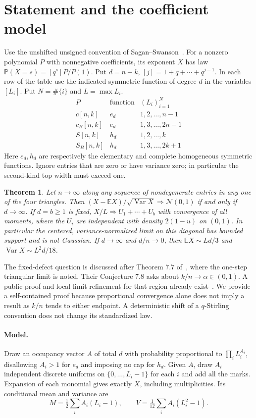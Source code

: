 \documentclass[11pt]{article}
\newtheorem{thm}{Theorem}\newtheorem{lem}{Lemma}\newcommand{\Var}{\operatorname{Var}}\newcommand{\Cov}{\operatorname{Cov}}\newcommand{\E}{\mathbb E}\newcommand{\Prob}{\mathbb P}
\begin{document}
\section{Statement and the coefficient model}
Use the unshifted unsigned convention of Sagan--Swanson~\cite{ss}. For a nonzero polynomial $P$ with nonnegative coefficients, its exponent $X$ has law $\Prob(X=s)=[q^s]P/P(1)$. Put $d=n-k$, $[j]=1+q+\cdots+q^{j-1}$. In each row of the table use the indicated symmetric function of degree $d$ in the variables $[L_i]$. Put $N=\#\{i\}$ and $L=\max L_i$.
\[
\begin{array}{c|cc}
P &\text{function}&(L_i)_{i=1}^N\\\hline
c[n,k]&e_d&1,2,\ldots,n-1\\
c_B[n,k]&e_d&1,3,\ldots,2n-1\\
S[n,k]&h_d&1,2,\ldots,k\\
S_B[n,k]&h_d&1,3,\ldots,2k+1
\end{array}
\]
Here $e_d,h_d$ are respectively the elementary and complete homogeneous symmetric functions. Ignore entries that are zero or have variance zero; in particular the second-kind top width must exceed one.
\begin{thm}\label{main}Let $n\to\infty$ along any sequence of nondegenerate entries in any one of the four triangles. Then $(X-\E X)/\sqrt{\Var X}\Rightarrow\mathcal N(0,1)$ if and only if $d\to\infty$. If $d=b\ge1$ is fixed, $X/L\Rightarrow U_1+\cdots+U_b$ with convergence of all moments, where the $U_i$ are independent with density $2(1-u)$ on $(0,1)$. In particular the centered, variance-normalized limit on this diagonal has bounded support and is not Gaussian. If $d\to\infty$ and $d/n\to0$, then $\E X\sim Ld/3$ and $\Var X\sim L^2d/18$.\end{thm}
The fixed-defect question is discussed after Theorem 7.7 of~\cite{ss}, where the one-step triangular limit is noted. Their Conjecture 7.8 asks about $k/n\to\alpha\in(0,1)$. A public proof and local limit refinement for that region already exist~\cite{prior}. We provide a self-contained proof because proportional convergence alone does not imply a result as $k/n$ tends to either endpoint. A deterministic shift of a $q$-Stirling convention does not change its standardized law.
\paragraph{Model.} Draw an occupancy vector $A$ of total $d$ with probability proportional to $\prod_i L_i^{A_i}$, disallowing $A_i>1$ for $e_d$ and imposing no cap for $h_d$. Given $A$, draw $A_i$ independent discrete uniforms on $\{0,\ldots,L_i-1\}$ for each $i$ and add all the marks. Expansion of each monomial gives exactly $X$, including multiplicities. Its conditional mean and variance are
\begin{equation}
M=\tfrac12\sum_i A_i(L_i-1),\qquad V=\tfrac1{12}\sum_i A_i(L_i^2-1). \label{mv}
\end{equation}
\end{document}
